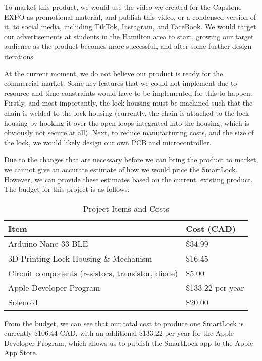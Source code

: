 \documentclass{article}
\begin{document}
To market this product, we would use the video we created for the Capstone EXPO as promotional material, and publish this video, or a condensed version of it, to social media, including TikTok, Instagram, and FaceBook. We would target our advertisements at students in the Hamilton area to start, growing our target audience as the product becomes more successful, and after some further design iterations.

At the current moment, we do not believe our product is ready for the commercial market. Some key features that we could not implement due to resource and time constraints would have to be implemented for this to happen. Firstly, and most importantly, the lock housing must be machined such that the chain is welded to the lock housing (currently, the chain is attached to the lock housing by hooking it over the open loops integrated into the housing, which is obviously not secure at all). Next, to reduce manufacturing costs, and the size of the lock, we would likely design our own PCB and microcontroller. 

Due to the changes that are necessary before we can bring the product to market, we cannot give an accurate estimate of how we would price the SmartLock. However, we can provide these estimates based on the current, existing product. The budget for this project is as follows:

\vspace{0.5cm}
\begin{table}
\begin{center}
\caption{Project Items and Costs}
\begin{tabular}{|l|l|}
    \hline
   \textbf{Item}  & \textbf{Cost (CAD)} \\
   \hline
    Arduino Nano 33 BLE & \$34.99 \\
    \hline
    3D Printing Lock Housing \& Mechanism & \$16.45 \\
    \hline
    Circuit components (resistors, transistor, diode) & \$5.00 \\
    \hline
    Apple Developer Program & \$133.22 per year \\
    \hline
    Solenoid & \$20.00 \\
    \hline
\end{tabular}
\end{center}
\end{table}

From the budget, we can see that our total cost to produce one SmartLock is currently \$106.44 CAD, with an additional \$133.22 per year for the Apple Developer Program, which allows us to publish the SmartLock app to the Apple App Store. 
\end{document}
